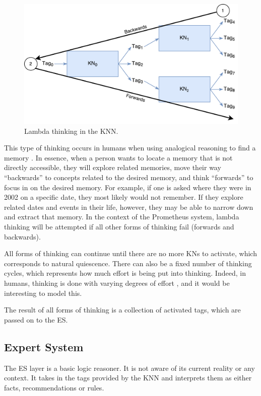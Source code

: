 \documentclass[titlepage,11pt]{article}
\begin{document}
\begin{figure}[!htb]
\includegraphics[width=\columnwidth]{figures/lambda_thinking.pdf}
\caption{Lambda thinking in the KNN.}
\label{think_lambda}
\end{figure}

This type of thinking occurs in humans when using analogical reasoning to find a memory \cite{vybihal-lambda}. In essence, when a person wants to locate a memory that is not directly accessible, they will explore related memories, move their way ``backwards'' to concepts related to the desired memory, and think ``forwards'' to focus in on the desired memory. For example, if one is asked where they were in 2002 on a specific date, they most likely would not remember. If they explore related dates and events in their life, however, they may be able to narrow down and extract that memory. In the context of the Prometheus system, lambda thinking will be attempted if all other forms of thinking fail (forwards and backwards).

All forms of thinking can continue until there are no more KNs to activate, which corresponds to natural quiescence. There can also be a fixed number of thinking cycles, which represents how much effort is being put into thinking. Indeed, in humans, thinking is done with varying degrees of effort \cite{thinking}, and it would be interesting to model this.

The result of all forms of thinking is a collection of activated tags, which are passed on to the ES.

\subsection{Expert System}

The ES layer is a basic logic reasoner. It is not aware of its current reality or any context. It takes in the tags provided by the KNN and interprets them as either facts, recommendations or rules.
\end{document}
